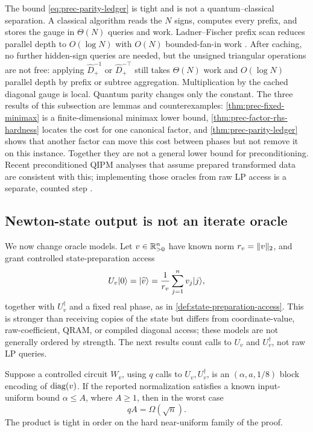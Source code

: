 The bound \eqref{eq:prec-parity-ledger} is tight and is not a
quantum--classical separation.  A classical
algorithm reads the $N$ signs, computes every prefix, and stores the gauge in
$\Theta(N)$ queries and work.  Ladner--Fischer prefix scan reduces parallel
depth to $O(\log N)$ with $O(N)$ bounded-fan-in work
\cite{ladner1980-parallel-prefix-computation}.  After caching, no further
hidden-sign queries are needed, but the unsigned triangular operations are
not free: applying $\widehat D_+^{-1}$ or $\widehat D_+^{-\top}$ still takes
$\Theta(N)$ work and $O(\log N)$ parallel depth by prefix or subtree
aggregation.  Multiplication by the cached diagonal gauge is local.  Quantum
parity changes only the constant.  The three results of this subsection are
lemmas and counterexamples: \cref{thm:prec-fixed-minimax} is a
finite-dimensional minimax lower bound, \cref{thm:prec-factor-rhs-hardness}
locates the cost for one canonical factor, and \cref{thm:prec-parity-ledger}
shows that another factor can move this cost between phases but not remove
it on this instance.  Together they are not a general lower bound for
preconditioning.  Recent preconditioned QIPM analyses that assume prepared transformed
data are consistent with this; implementing those oracles from raw LP access
is a separate, counted step
\cite{zeguan2026-preconditioned-inexact-infeasible-quantum-interi}.

\subsection{Newton-state output is not an iterate oracle}
\label{sec:preconditioning-state-interface}

We now change oracle models.  Let $v\in\mathbb{R}_{>0}^n$ have known norm $r_v=\lVert v\rVert_2$, and grant controlled
state-preparation access
\begin{equation}
 U_v\lvert 0\rangle=\lvert \widehat v\rangle=\frac1{r_v}\sum_{j=1}^nv_j\lvert j\rangle,
 \label{eq:prec-state-oracle}
\end{equation}
together with $U_v^\dagger$ and a fixed real phase, as in
\cref{def:state-preparation-access}.  This is stronger than receiving copies
of the state but differs from coordinate-value, raw-coefficient, QRAM, or
compiled diagonal access; these models are not generally ordered by strength.
The next results count calls to $U_v$ and $U_v^\dagger$, not raw LP queries.

\begin{theorem}
\label{thm:prec-state-diagonal}
Suppose a controlled circuit $W_v$, using $q$ calls to
$U_v,U_v^\dagger$, is an $(\alpha,a,1/8)$ block encoding of
$\operatorname{diag}(v)$.  If the reported normalization satisfies a known input-uniform
bound $\alpha\leq A$, where $A\geq1$, then in the worst case
\begin{equation}
 \boxed{qA=\Omega(\sqrt n)}.                              \label{eq:prec-qA}
\end{equation}
The product is tight in order on the hard near-uniform family of the proof.
\end{theorem}

